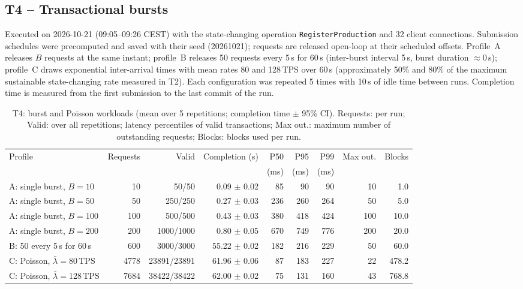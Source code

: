 \subsection{T4 -- Transactional bursts}
Executed on 2026-10-21 (09:05--09:26 CEST) with the state-changing
operation \texttt{RegisterProduction} and 32 client connections. Submission schedules were precomputed and
saved with their seed (20261021); requests are released open-loop at their scheduled offsets.
Profile~A releases $B$ requests at the same instant; profile~B releases 50 requests every 5\,s for
60\,s (inter-burst interval 5\,s, burst duration $\approx$0\,s); profile~C draws exponential
inter-arrival times with mean rates 80 and 128\,TPS over 60\,s
(approximately 50\% and 80\% of the maximum sustainable state-changing rate measured in T2). Each configuration was
repeated 5 times with 10\,s of idle time between runs. Completion time is measured from the first
submission to the last commit of the run.

\begin{table}[H]
\centering\small
\caption{T4: burst and Poisson workloads (mean over 5 repetitions; completion time $\pm$ 95\% CI). Requests: per
run; Valid: over all repetitions; latency percentiles of valid transactions; Max out.: maximum number of outstanding
requests; Blocks: blocks used per run.}
\label{tab:t4}
\setlength{\tabcolsep}{3.5pt}
\begin{tabular}{lrrrrrrrr}
\toprule
Profile & Requests & Valid & Completion (s) & P50 & P95 & P99 & Max out. & Blocks \\
 & & & & (ms) & (ms) & (ms) & & \\
\midrule
A: single burst, $B=10$ & 10 & 50/50 & 0.09 $\pm$ 0.02 & 85 & 90 & 90 & 10 & 1.0 \\
A: single burst, $B=50$ & 50 & 250/250 & 0.27 $\pm$ 0.03 & 236 & 260 & 264 & 50 & 5.0 \\
A: single burst, $B=100$ & 100 & 500/500 & 0.43 $\pm$ 0.03 & 380 & 418 & 424 & 100 & 10.0 \\
A: single burst, $B=200$ & 200 & 1000/1000 & 0.80 $\pm$ 0.05 & 670 & 749 & 776 & 200 & 20.0 \\
B: 50 every 5\,s for 60\,s & 600 & 3000/3000 & 55.22 $\pm$ 0.02 & 182 & 216 & 229 & 50 & 60.0 \\
C: Poisson, $\bar\lambda=80$\,TPS & 4778 & 23891/23891 & 61.96 $\pm$ 0.06 & 87 & 183 & 227 & 22 & 478.2 \\
C: Poisson, $\bar\lambda=128$\,TPS & 7684 & 38422/38422 & 62.00 $\pm$ 0.02 & 75 & 131 & 160 & 43 & 768.8 \\
\bottomrule
\end{tabular}
\end{table}

